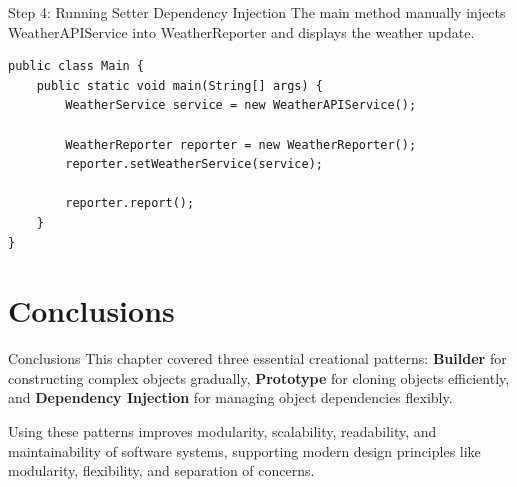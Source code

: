 \documentclass[aspectratio=169, table]{beamer}
\begin{document}
\begin{frame}[fragile]{Step 4: Running Setter Dependency Injection}
\vspace{20pt}
The main method manually injects WeatherAPIService into WeatherReporter and displays the weather update.

\begin{lstlisting}[style=JavaStyle]
public class Main {
	public static void main(String[] args) {
		WeatherService service = new WeatherAPIService();
		
		WeatherReporter reporter = new WeatherReporter();
		reporter.setWeatherService(service);
		
		reporter.report();
	}
}
\end{lstlisting}
\end{frame}

\section{Conclusions}

\begin{frame}[fragile]{Conclusions}
\vspace{20pt}
This chapter covered three essential creational patterns: \textbf{Builder} for constructing complex objects gradually, \textbf{Prototype} for cloning objects efficiently, and \textbf{Dependency Injection} for managing object dependencies flexibly.

\vspace{10pt}
Using these patterns improves modularity, scalability, readability, and maintainability of software systems, supporting modern design principles like modularity, flexibility, and separation of concerns.
\end{frame}
\end{document}

